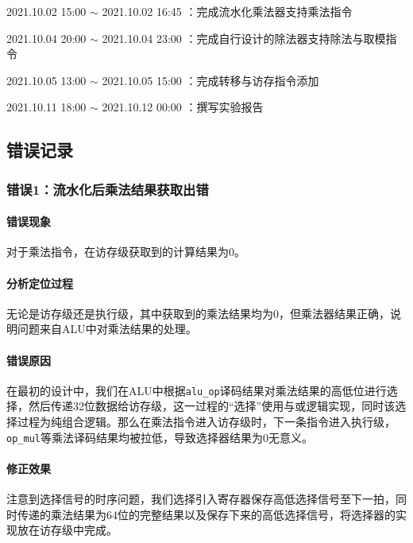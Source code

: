 \documentclass[UTF-8,twoside,c5size]{ctexart}
\begin{document}
	2021.10.02 15:00 $\sim$ 2021.10.02 16:45 ：完成流水化乘法器支持乘法指令
	
	2021.10.04 20:00 $\sim$ 2021.10.04 23:00 ：完成自行设计的除法器支持除法与取模指令
	
	2021.10.05 13:00 $\sim$ 2021.10.05 15:00 ：完成转移与访存指令添加
	
	2021.10.11 18:00 $\sim$ 2021.10.12 00:00 ：撰写实验报告
	
	\subsection{错误记录}	
	\subsubsection{错误\textbf{1：}流水化后乘法结果获取出错}
	\paragraph{错误现象}\hfill
	
	
	对于乘法指令，在访存级获取到的计算结果为0。
	
	\paragraph{分析定位过程}\hfill
	
	无论是访存级还是执行级，其中获取到的乘法结果均为0，但乘法器结果正确，说明问题来自ALU中对乘法结果的处理。
	
	\paragraph{错误原因}\hfill
	
	在最初的设计中，我们在ALU中根据\texttt{alu\_op}译码结果对乘法结果的高低位进行选择，然后传递32位数据给访存级，这一过程的“选择”使用与或逻辑实现，同时该选择过程为纯组合逻辑。那么在乘法指令进入访存级时，下一条指令进入执行级，\texttt{op\_mul}等乘法译码结果均被拉低，导致选择器结果为0无意义。
	
	\paragraph{修正效果}\hfill
	
	注意到选择信号的时序问题，我们选择引入寄存器保存高低选择信号至下一拍，同时传递的乘法结果为64位的完整结果以及保存下来的高低选择信号，将选择器的实现放在访存级中完成。
			
\end{document}

